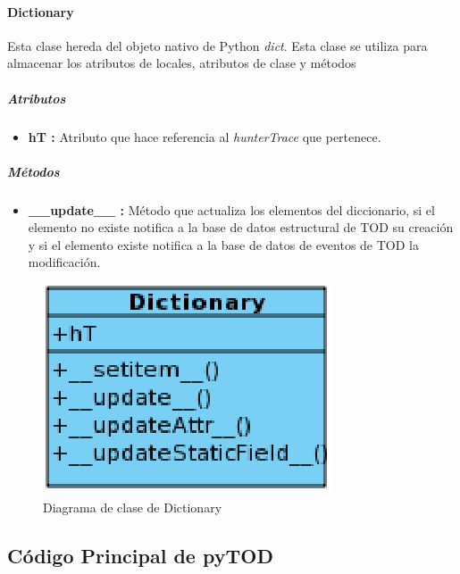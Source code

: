\documentclass[12pt,legalpaper]{report}
\begin{document}
				\paragraph{Dictionary}
				
Esta clase hereda del objeto nativo de Python \textit{dict}.  Esta clase se utiliza para almacenar los atributos de locales, atributos de clase y métodos										
					\subparagraph{Atributos}
					
\begin{itemize}
	\item \textbf{hT :} Atributo que hace referencia al \textit{hunterTrace} que pertenece. 
\end{itemize}					
					
					
					\subparagraph{Métodos}						
					
\begin{itemize}
	\item \textbf{\_\_update\_\_ :}  Método que actualiza los elementos del diccionario, si el elemento no existe notifica a la base de datos estructural de TOD su creación y si el elemento existe notifica a la base de datos de eventos de TOD la modificación.
\end{itemize}					
					
				
\begin{figure}[!h]
	\centering
	\includegraphics[scale=0.6]{images/Clases/Dictionary.eps}
	\caption{Diagrama de clase de Dictionary}
\end{figure}
					
		
		
		\subsection{Código Principal de pyTOD}
		
\end{document}
